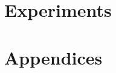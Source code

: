 \documentclass[12pt,a4paper]{article}
\numberwithin{figure}{section}
\numberwithin{table}{section}
\numberwithin{algorithm}{section}
\begin{document}
\part{Experiments}



%








\part{Appendices}
\appendix





%

\end{document}
